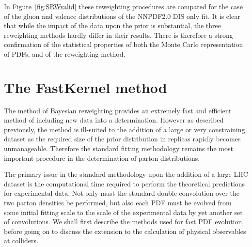 In Figure~\ref{fig:SRWvalid} these reweighting procedures are compared for the case of the gluon and valence distributions of the NNPDF2.0 DIS only fit. It is clear that while the impact of the data upon the prior is substantial, the three reweighting methods hardly differ in their results. There is therefore a strong confirmation of the statistical properties of both the Monte Carlo representation of PDFs, and of the reweighting method.

\section{The FastKernel method}
The method of Bayesian reweighting provides an extremely fast and efficient method of including new data into a determination. However as described previously, the method is
ill-suited to the addition of a large or very constraining dataset as the required size of the prior distribution in replicas rapidly becomes unmanageable. Therefore the standard fitting methodology
remains the most important procedure in the determination of parton distributions.

The primary issue in the standard methodology upon the addition of a large LHC dataset is the computational time required to perform the theoretical predictions for experimental data.
Not only must the standard double convolution over the two parton densities be performed, but also each PDF must be evolved from some initial fitting scale to the scale of the experimental data by yet another set of convolutions. We shall first describe the methods used for fast PDF evolution, before going on to discuss the extension to the calculation of physical observables at colliders.

